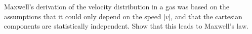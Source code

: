 

Maxwell's derivation of the velocity distribution in a gas was based on the assumptions that it could only depend on the speed $\left \lvert v \right \rvert$, and that the cartesian components are statistically independent.
Show that this leads to Maxwell's law.

